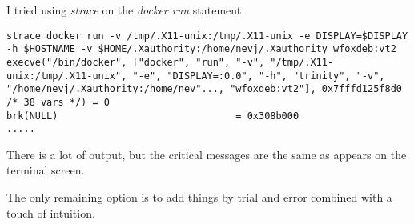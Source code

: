 \documentclass{article}  %
\begin{document}
I tried using {\em strace} on the {\em docker run} statement
\begin{verbatim}
strace docker run -v /tmp/.X11-unix:/tmp/.X11-unix -e DISPLAY=$DISPLAY -h $HOSTNAME -v $HOME/.Xauthority:/home/nevj/.Xauthority wfoxdeb:vt2
execve("/bin/docker", ["docker", "run", "-v", "/tmp/.X11-unix:/tmp/.X11-unix", "-e", "DISPLAY=:0.0", "-h", "trinity", "-v", "/home/nevj/.Xauthority:/home/nev"..., "wfoxdeb:vt2"], 0x7fffd125f8d0 /* 38 vars */) = 0
brk(NULL)                               = 0x308b000
.....
\end{verbatim}
There is  a lot of output,  but the critical messages are the same as appears on the terminal screen.

The only remaining option is to add things by trial and error combined with a touch of intuition.
\end{document}
